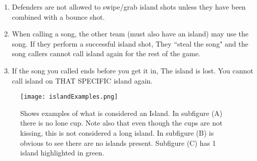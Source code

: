 \begin{enumerate}[label=(\roman*)]
            \item \label{sssec:IslandShots,swiping} Defenders are not allowed to swipe/grab island shots unless they have been combined with a bounce shot.
            \item \label{sssec:IslandShots,stelaing} When calling a  song, the other team (must also have an island) may use the song.
                If they perform a successful island shot, They ``steal the song" and the song callers cannot call island again for the rest of the game.
            \item \label{sssec:IslandShots,endsong} If the song you called ends before you get it in, The island is lost.
                You cannot call island on THAT SPECIFIC island again.
        \end{enumerate}
        \begin{figure}[H]
            \centering
            \texttt{[image: islandExamples.png]}
            \caption{Shows examples of what is considered an Island. In subfigure (A) there is no lone cup. Note also that even though the cups are not kissing, this is not considered a long island. In subfigure (B) is obvious to see there are no islands present. Subfigure (C) has 1 island highlighted in green.}
            \label{fig:islandExamples}
        \end{figure}
